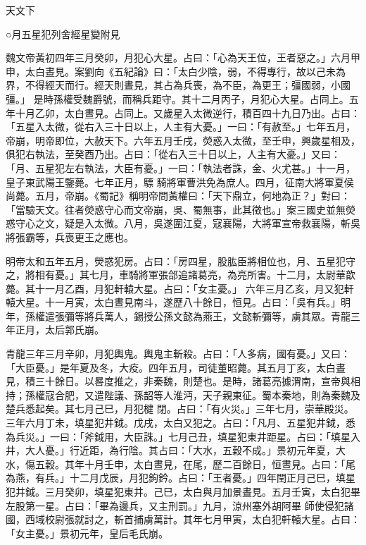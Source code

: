 
\begin{pinyinscope}
天文下



 ○月五星犯列舍經星變附見



 魏文帝黃初四年三月癸卯，月犯心大星。占曰：「心為天王位，王者惡之。」六月甲申，太白晝見。案劉向《五紀論》曰：「太白少陰，弱，不得專行，故以己未為界，不得經天而行。經天則晝見，其占為兵喪，為不臣，為更王；彊國弱，小國彊。」
 是時孫權受魏爵號，而稱兵距守。其十二月丙子，月犯心大星。占同上。五年十月乙卯，太白晝見。占同上。又歲星入太微逆行，積百四十九日乃出。占曰：「五星入太微，從右入三十日以上，人主有大憂。」一曰：「有赦至。」七年五月，帝崩，明帝即位，大赦天下。六年五月壬戌，熒惑入太微，至壬申，興歲星相及，俱犯右執法，至癸酉乃出。占曰：「從右入三十日以上，人主有大憂。」又曰：「月、五星犯左右執法，大臣有憂。」一曰：「執法者誅，金、火尤甚。」十一月，皇子東武陽王鑒薨。七年正月，驃
 騎將軍曹洪免為庶人。四月，征南大將軍夏侯尚薨。五月，帝崩。《蜀記》稱明帝問黃權曰：「天下鼎立，何地為正？」對曰：「當驗天文。往者熒惑守心而文帝崩，吳、蜀無事，此其徵也。」案三國史並無熒惑守心之文，疑是入太微。八月，吳遂圍江夏，寇襄陽，大將軍宣帝救襄陽，斬吳將張霸等，兵喪更王之應也。



 明帝太和五年五月，熒惑犯房。占曰：「房四星，股肱臣將相位也，月、五星犯守之，將相有憂。」其七月，車騎將軍張郃追諸葛亮，為亮所害。十二月，太尉華歆薨。其十一月乙酉，月犯軒轅大星。占曰：「女主憂。」
 六年三月乙亥，月又犯軒轅大星。十一月寅，太白晝見南斗，遂歷八十餘日，恒見。占曰：「吳有兵。」明年，孫權遣張彌等將兵萬人，錫授公孫文懿為燕王，文懿斬彌等，虜其眾。青龍三年正月，太后郭氏崩。



 青龍三年三月辛卯，月犯輿鬼。輿鬼主斬殺。占曰：「人多病，國有憂。」又曰：「大臣憂。」是年夏及冬，大疫。四年五月，司徒董昭薨。其五月丁亥，太白晝見，積三十餘日。以晷度推之，非秦魏，則楚也。是時，諸葛亮據渭南，宣帝與相持；孫權寇合肥，又遣陛議、孫韶等人淮沔，天子親東征。蜀本秦地，則為秦魏及楚兵悉起矣。其七月己巳，月犯楗
 閉。占曰：「有火災。」三年七月，崇華殿災。三年六月丁未，填星犯井鉞。戊戌，太白又犯之。占曰：「凡月、五星犯井鉞，悉為兵災。」一曰：「斧鉞用，大臣誅。」七月己丑，填星犯東井距星。占曰：「填星入井，大人憂。」行近距，為行陰。其占曰：「大水，五穀不成。」景初元年夏，大水，傷五穀。其年十月壬申，太白晝見，在尾，歷二百餘日，恒晝見。占曰：「尾為燕，有兵。」十二月戊辰，月犯鉤鈐。占曰：「王者憂。」四年閏正月己巳，填星犯井鉞。三月癸卯，填星犯東井。己巳，太白與月加景晝見。五月壬寅，太白犯畢左股第一星。占曰：「畢為邊兵，又主刑罰。」九月，涼州塞外胡阿畢
 師使侵犯諸國，西域校尉張就討之，斬首捕虜萬計。其年七月甲寅，太白犯軒轅大星。占曰：「女主憂。」景初元年，皇后毛氏崩。




\end{pinyinscope}
